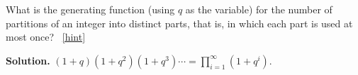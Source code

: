 \documentclass{book}
\begin{document}
\setcounter{project}{322}
\addtocounter{project}{-1}
\begin{activity}[]\label{activity-315}
\hypertarget{p-1671}{}%
What is the generating function (using \(q\) as the variable) for the number of partitions of an integer into distinct parts, that is, in which each part is used at most once?%
~\hfill{\tiny\hyperlink{a-322}{[hint]}\hypertarget{q-322}{}}\par\smallskip%
\noindent\textbf{Solution.}\hypertarget{solution-260}{}\quad%
\hypertarget{p-1673}{}%
\(\displaystyle (1+q)(1+q^2)(1+q^3)\cdots=
\prod_{i=1}^\infty(1+q^i)\).%
\end{activity}
\end{document}
